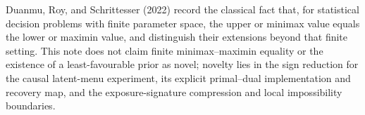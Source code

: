 Duanmu, Roy, and Schrittesser (2022) record the classical fact that, for statistical decision problems with finite parameter space, the upper or minimax value equals the lower or maximin value, and distinguish their extensions beyond that finite setting. This note does not claim finite minimax--maximin equality or the existence of a least-favourable prior as novel; novelty lies in the sign reduction for the causal latent-menu experiment, its explicit primal--dual implementation and recovery map, and the exposure-signature compression and local impossibility boundaries.